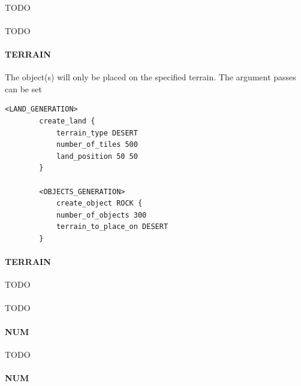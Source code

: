 \begin{appendices}
    \paragraph{}

    TODO

    \paragraph{}

    TODO

    \paragraph{ TERRAIN}

    The object(s) will only be placed on the specified terrain. The argument passes can be set 

    \begin{lstlisting}[language={rms}, caption={Example where place decorative rocks on a central desert..}]
        <LAND_GENERATION>
        create_land {
            terrain_type DESERT
            number_of_tiles 500
            land_position 50 50
        }

        <OBJECTS_GENERATION>
            create_object ROCK {
            number_of_objects 300
            terrain_to_place_on DESERT
        }
    \end{lstlisting}

    \paragraph{ TERRAIN}

    TODO

    \paragraph{}

    TODO

    \paragraph{ NUM}

    TODO

    \paragraph{ NUM}


\end{appendices}
